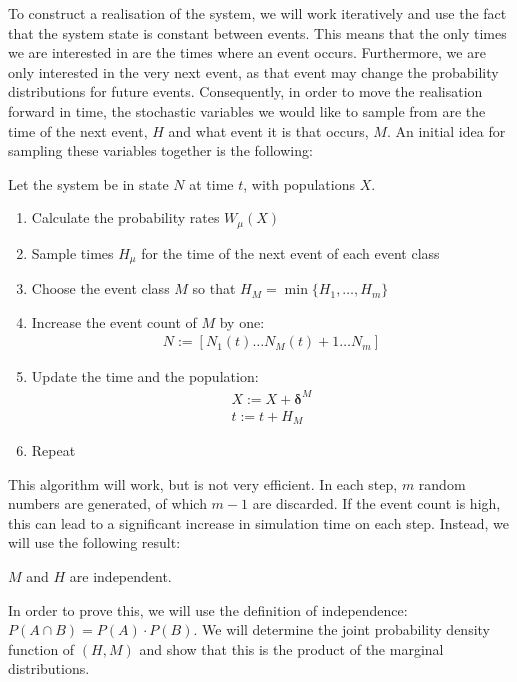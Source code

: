 \documentclass[10pt,a4paper]{article}
\begin{document}
To construct a realisation of the system, we will work iteratively and use the fact that the system state is constant between events. This means that the only times we are interested in are the times where an event occurs. Furthermore, we are only interested in the very next event, as that event may change the probability distributions for future events. Consequently, in order to move the realisation forward in time, the stochastic variables we would like to sample from are the time of the next event, $H$ and what event it is that occurs, $M$. An initial idea for sampling these variables together is the following:

\begin{algorithm} Let the system be in state $N$ at time $t$, with populations $X$. \label{algorithm:bad}
	\begin{enumerate}
		\item Calculate the probability rates $W_\mu \left( X \right)$
		\item Sample times $H_\mu$ for the time of the next event of each event class
		\item Choose the event class $M$ so that $H_M = \min \{ H_1, \ldots, H_m \}$
		\item Increase the event count of $M$ by one:
			\begin{align*}
				N := \left[ N_1\left(t \right) \ldots N_M \left( t \right) + 1 \ldots N_m \right]
			\end{align*}
		\item Update the time and the population:
			\begin{align*}
				X := X + \bm{\delta}^{M} \\
				t := t + H_M
			\end{align*}
		\item Repeat
	\end{enumerate}
\end{algorithm}

This algorithm will work, but is not very efficient. In each step, $m$ random numbers are generated, of which $m-1$ are discarded. If the event count is high, this can lead to a significant increase in simulation time on each step. Instead, we will use the following result:

\begin{lemma} \label{lemma:independence} %
	$M$ and $H$ are independent.
\end{lemma}

In order to prove this, we will use the definition of independence: $P \left( A \cap B \right) = P \left( A \right) \cdot P \left( B \right)$. We will determine the joint probability density function of $(H, M)$ and show that this is the product of the marginal distributions.
\end{document}
